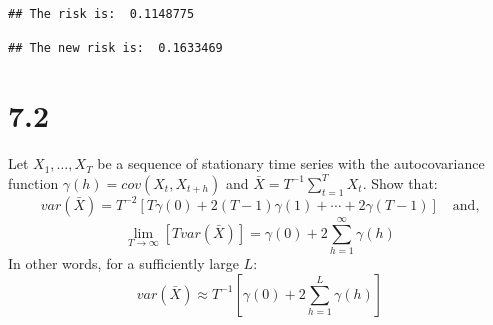 \documentclass[11pt,]{article}
\newenvironment{Shaded}{\begin{snugshade}}{\end{snugshade}}
\newcommand{\KeywordTok}[1]{\textcolor[rgb]{0.13,0.29,0.53}{\textbf{#1}}}
\newcommand{\DecValTok}[1]{\textcolor[rgb]{0.00,0.00,0.81}{#1}}
\newcommand{\CharTok}[1]{\textcolor[rgb]{0.31,0.60,0.02}{#1}}
\newcommand{\StringTok}[1]{\textcolor[rgb]{0.31,0.60,0.02}{#1}}
\newcommand{\CommentTok}[1]{\textcolor[rgb]{0.56,0.35,0.01}{\textit{#1}}}
\newcommand{\OperatorTok}[1]{\textcolor[rgb]{0.81,0.36,0.00}{\textbf{#1}}}
\newcommand{\NormalTok}[1]{#1}
\begin{document}
\begin{Shaded}
\end{Shaded}

\begin{verbatim}
## The risk is:  0.1148775
\end{verbatim}

\begin{Shaded}
\end{Shaded}

\begin{verbatim}
## The new risk is:  0.1633469
\end{verbatim}

\section{7.2}\label{section-1}

Let \(X_1, \ldots, X_T\) be a sequence of stationary time series with
the autocovariance function \(\gamma(h) = cov(X_t, X_{t+h})\) and
\(\bar{X} = T^{-1} \sum_{t=1}^T X_t\). Show that: \[
var(\bar{X}) = T^{-2}[T \gamma(0) + 2(T-1)\gamma(1) + \cdots + 2\gamma(T-1)] \quad \text{and,}
\] \[
\lim_{T \rightarrow \infty}[T var(\bar{X})] = \gamma(0) + 2\sum_{h=1}^\infty \gamma(h)
\] In other words, for a sufficiently large \(L\): \[
var(\bar{X}) \approx T^{-1} [\gamma(0) + 2\sum_{h=1}^L \gamma(h)]
\]
\end{document}
